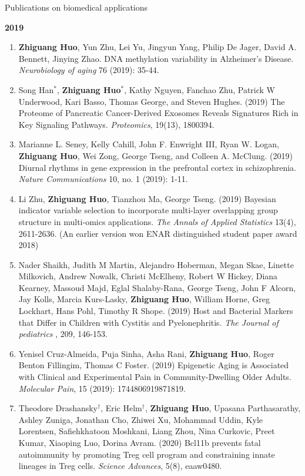 \documentclass{resume} %
\begin{document}
\begin{rSection}{Publications on biomedical applications}
\begin{enumerate}[noitemsep,topsep=0pt, resume]
\end{enumerate}


\textbf{2019}
\begin{enumerate}[noitemsep,topsep=0pt,resume]

\item 
{\bf Zhiguang Huo}, Yun Zhu, Lei Yu, Jingyun Yang, Philip De Jager, David A. Bennett, Jinying Zhao.
 DNA methylation variability in Alzheimer's Disease. \emph{Neurobiology of aging} 76 (2019): 35-44.

\item Song Han$^*$, {\bf Zhiguang Huo}$^*$,  Kathy Nguyen,  Fanchao Zhu, Patrick W Underwood, Kari Basso, Thomas George, and Steven Hughes. (2019)
The Proteome of Pancreatic Cancer-Derived Exosomes Reveals Signatures Rich in Key Signaling Pathways. \emph{Proteomics}, 19(13), 1800394.

\item Marianne L. Seney, Kelly Cahill, John F. Enwright III, Ryan W. Logan, {\bf  Zhiguang Huo}, Wei Zong, George Tseng, and Colleen A. McClung. (2019) Diurnal rhythms in gene expression in the prefrontal cortex in schizophrenia. \emph{Nature Communications} 10, no. 1 (2019): 1-11.

\item Li Zhu, {\bf  Zhiguang Huo}, Tianzhou Ma, George Tseng. (2019)
Bayesian indicator variable selection to incorporate multi-layer overlapping group structure in multi-omics applications. 
\emph{The Annals of Applied Statistics} 13(4), 2611-2636. 
(An earlier version won ENAR distinguished student paper award 2018)

\item  
Nader Shaikh, Judith M Martin, Alejandro Hoberman, Megan Skae, Linette Milkovich, Andrew Nowalk, Christi McElheny, Robert W Hickey, Diana Kearney, Massoud Majd, Eglal Shalaby-Rana, George Tseng, John F Alcorn, Jay Kolls, Marcia Kurs-Lasky, {\bf Zhiguang Huo}, William Horne, Greg Lockhart, Hans Pohl, Timothy R Shope. 
(2019)
Host and Bacterial Markers that Differ in Children with Cystitis and Pyelonephritis. \emph{The Journal of pediatrics} , 209, 146-153.

\item Yenisel Cruz-Almeida, Puja Sinha, Asha Rani, {\bf Zhiguang Huo}, Roger Benton Fillingim, Thomas C Foster. (2019)
Epigenetic Aging is Associated with Clinical and Experimental Pain in Community-Dwelling Older Adults.
\emph{Molecular Pain}, 15 (2019): 1744806919871819.

\item 
Theodore Drashansky$^\dagger$, Eric  Helm$^\dagger$, {\bf Zhiguang Huo}, Upasana Parthasarathy,  Ashley Zuniga, Jonathan Cho, Zhiwei Xu,  Mohammad Uddin,  Kyle Lorentsen, Safiehkhatoon Moshkani, Liang Zhou, Nina Curkovic, Preet Kumar,  Xiaoping Luo, Dorina Avram. (2020)
Bcl11b prevents fatal autoimmunity by promoting Treg cell program and constraining innate lineages in Treg cells. 
\emph{Science Advances}, 5(8), eaaw0480.



\end{enumerate}
\end{rSection}
\end{document}
